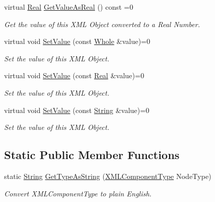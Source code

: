 \begin{DoxyCompactItemize}
virtual \hyperlink{namespacephys_af7eb897198d265b8e868f45240230d5f}{Real} \hyperlink{classphys_1_1xml_1_1Base_aac1bc66a1c92164b7924f57d60bec7f1}{GetValueAsReal} () const =0
\begin{DoxyCompactList}\small\item\em Get the value of this XML Object converted to a Real Number. \item\end{DoxyCompactList}\item 
virtual void \hyperlink{classphys_1_1xml_1_1Base_af0918775deab4361a5eccb42914480f8}{SetValue} (const \hyperlink{namespacephys_a460f6bc24c8dd347b05e0366ae34f34a}{Whole} \&value)=0
\begin{DoxyCompactList}\small\item\em Set the value of this XML Object. \item\end{DoxyCompactList}\item 
virtual void \hyperlink{classphys_1_1xml_1_1Base_ab3b63010428e7ffec34d35ba38017b0c}{SetValue} (const \hyperlink{namespacephys_af7eb897198d265b8e868f45240230d5f}{Real} \&value)=0
\begin{DoxyCompactList}\small\item\em Set the value of this XML Object. \item\end{DoxyCompactList}\item 
virtual void \hyperlink{classphys_1_1xml_1_1Base_af688d98141bd19ed7ca74be9679e7b52}{SetValue} (const \hyperlink{namespacephys_aa03900411993de7fbfec4789bc1d392e}{String} \&value)=0
\begin{DoxyCompactList}\small\item\em Set the value of this XML Object. \item\end{DoxyCompactList}\end{DoxyCompactItemize}
\subsection*{Static Public Member Functions}
\begin{DoxyCompactItemize}
\item 
static \hyperlink{namespacephys_aa03900411993de7fbfec4789bc1d392e}{String} \hyperlink{classphys_1_1xml_1_1Base_a2fa6625647ed526323d66d5972c1b2f0}{GetTypeAsString} (\hyperlink{classphys_1_1xml_1_1Base_a62ba0484b5ecb502f9ae9d82d3720320}{XMLComponentType} NodeType)
\begin{DoxyCompactList}\small\item\em Convert XMLComponentType to plain English. \item\end{DoxyCompactList}\end{DoxyCompactItemize}
